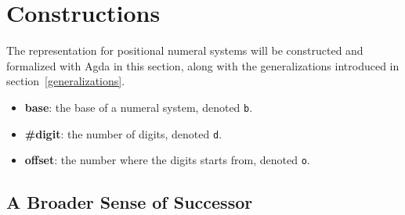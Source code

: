 \documentclass[\main/thesis.tex]{subfiles}
\begin{document}
\chapter{Constructions}\label{constructions}

The representation for positional numeral systems will be constructed and
formalized with Agda in this section,
along with the generalizations introduced in section~\ref{generalizations}.

\begin{itemize}
    \item \textbf{base}: the base of a numeral system, denoted {\lstinline|b|}.
    \item \textbf{\#digit}: the number of digits, denoted {\lstinline|d|}.
    \item \textbf{offset}: the number where the digits starts from, denoted {\lstinline|o|}.
\end{itemize}











\section{A Broader Sense of Successor}


%
%
%
\end{document}
